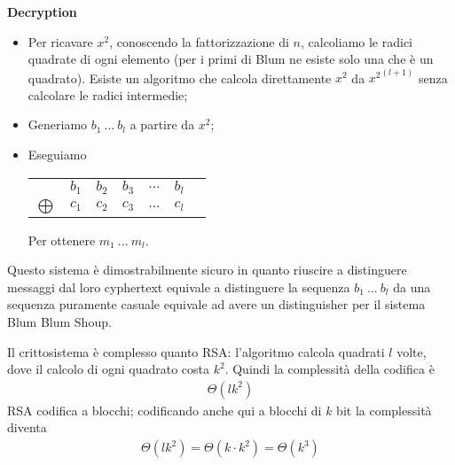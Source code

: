 \noindent \textbf{Decryption}
\begin{itemize}
    \item Per ricavare $x^2$, conoscendo la fattorizzazione di $n$, calcoliamo le radici quadrate di ogni elemento (per i primi di Blum ne esiste solo una che è un quadrato). Esiste un algoritmo che calcola direttamente  $x^2$ da ${x^2}^{(l+1)}$ senza calcolare le radici intermedie;
    \item Generiamo $b_1 \ ... \ b_l$ a partire da $x^2$;
    \item Eseguiamo 
    \begin{center}
            \begin{tabular}{ c c c c c c c }
              & $b_1$ & $b_2$ & $b_3$ & $...$ & $b_l$ & \\
              $\bigoplus$ & $c_1$ & $c_2$ & $c_3$ & $...$ & $c_l$ & \\
            \end{tabular}
        \end{center}

        Per ottenere $m_1 \ ... \ m_l$.
\end{itemize}

\noindent Questo sistema è dimostrabilmente sicuro in quanto riuscire a distinguere messaggi dal loro cyphertext equivale a distinguere la sequenza $b_1 \ ... \ b_l$ da una sequenza puramente casuale equivale ad avere un distinguisher per il sistema Blum Blum Shoup. 

Il crittosistema è complesso quanto RSA: l'algoritmo calcola quadrati $l$ volte, dove il calcolo di ogni quadrato costa $k^2$. Quindi la complessità della codifica è
\begin{align*}
    \Theta(lk^2)
\end{align*}
\noindent RSA codifica a blocchi; codificando anche qui a blocchi di $k$ bit la complessità diventa 
\begin{align*}
    \Theta(lk^2) = \Theta(k \cdot k^2) = \Theta(k^3)
\end{align*}









